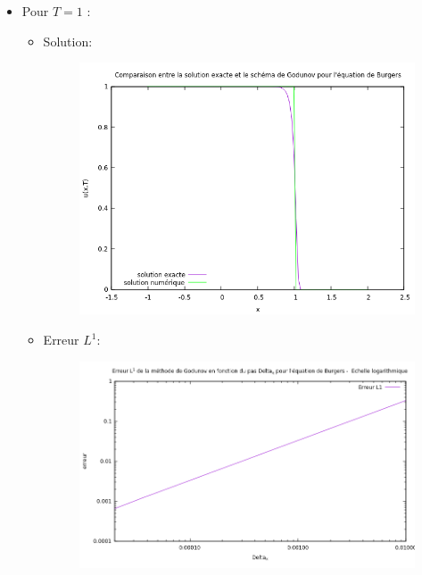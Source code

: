 \begin{itemize}
\begin{itemize}
\end{itemize}

\item Pour $T = 1$ : 

\begin{itemize}

\item Solution: 

\begin{figure}[h!]
	\centering \includegraphics[scale=0.7]{Images_Fichiers/burgers2.png}
\end{figure}

\item Erreur $L^1$: 

\begin{figure}[h!]
	\centering \includegraphics[scale=0.7]{Images_Fichiers/berreur2.png}
\end{figure}


\end{itemize}
\end{itemize}
